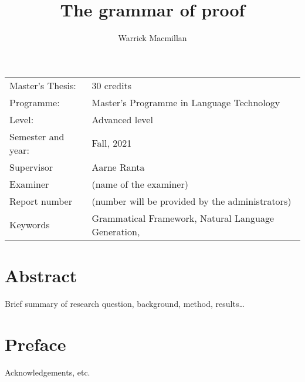 \documentclass[11pt, a4paper]{article}
\title{The grammar of proof}
\author{Warrick Macmillan}
\begin{document}
\begin{titlepage}

\maketitle

\vfill

\begingroup
\renewcommand*{\arraystretch}{1.2}
\begin{tabular}{l@{\hskip 20mm}l}
\hline
Master's Thesis: & 30 credits\\
Programme: & Master’s Programme in Language Technology\\
Level: & Advanced level \\
Semester and year: & Fall, 2021\\
Supervisor & Aarne Ranta\\
Examiner & (name of the examiner)\\
Report number & (number will be provided by the administrators) \\
Keywords &  Grammatical Framework, Natural Language Generation,\\
\end{tabular}
\endgroup

\thispagestyle{empty}
\end{titlepage}

\newpage
\singlespacing
\section*{Abstract}

Brief summary of research question, background, method, results\ldots

\thispagestyle{empty}

\newpage
\section*{Preface}

Acknowledgements, etc.
\end{document}
